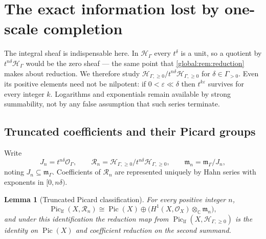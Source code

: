 \documentclass[11pt,letterpaper]{article}
\newtheorem{lemma}[lemma]{Lemma}
\theoremstyle{definition}
\theoremstyle{remark}
\newcommand{\C}{\mathbb C}
\newcommand{\OO}{\mathcal O}
\newcommand{\HH}{\mathscr H_\Gamma}
\newcommand{\HI}{\mathscr H_{\Gamma,\ge0}}
\newcommand{\mK}{\mathfrak m_\Gamma}
\newcommand{\Pic}{\operatorname{Pic}}
\newcommand{\Piclf}{\operatorname{Pic}_{\mathrm{lf}}}
\numberwithin{equation}{section}
\begin{document}
\section{The exact information lost by one-scale completion}\label{global:sec:onescale}

The integral sheaf is indispensable here. In $\HH$ every $t^\delta$ is a unit, so a quotient by $t^{n\delta}\HH$ would be the zero sheaf --- the same point that \cref{global:rem:reduction} makes about reduction. We therefore study $\HI/t^{n\delta}\HI$ for $\delta\in\Gamma_{>0}$. Even its positive elements need not be nilpotent: if $0<\varepsilon\ll\delta$ then $t^{k\varepsilon}$ survives for every integer $k$. Logarithms and exponentials remain available by strong summability, not by any false assumption that such series terminate.

\subsection{Truncated coefficients and their Picard groups}

Write
\[
  J_n=t^{n\delta}\OO_\Gamma,\qquad
  \mathscr R_n=\HI/t^{n\delta}\HI,\qquad
  \mathfrak m_n=\mK/J_n,
\]
noting $J_n\subseteq\mK$. Coefficients of $\mathscr R_n$ are represented uniquely by Hahn series with exponents in $[0,n\delta)$.

\begin{lemma}[Truncated Picard classification]\label{global:lem:truncatedpic}
For every positive integer $n$,
\begin{equation}\label{global:eq:truncatedpic}
  \Piclf(X,\mathscr R_n)\cong\Pic(X)\oplus\bigl(H^1(X,\OO_X)\otimes_\C\mathfrak m_n\bigr),
\end{equation}
and under this identification the reduction map from $\Piclf(X,\HI)$ is the identity on $\Pic(X)$ and coefficient reduction on the second summand.
\end{lemma}
\end{document}
